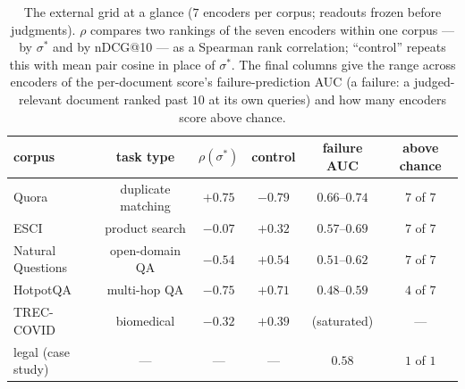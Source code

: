 \documentclass[11pt,letterpaper]{article}
\newcommand{\sstar}{\sigma^{*}}
\begin{document}
\begin{table}[t]
\centering
\caption{The external grid at a glance ($7$ encoders per corpus; readouts
frozen before judgments). $\rho$ compares two rankings of the seven
encoders within one corpus --- by $\sstar$ and by nDCG@10 --- as a
Spearman rank correlation; ``control'' repeats this with mean pair cosine
in place of $\sstar$. The final columns give the range across encoders of
the per-document score's failure-prediction AUC (a failure: a
judged-relevant document ranked past $10$ at its own queries) and how many
encoders score above chance.}
\label{tab:external}
\small
\begin{tabular}{lccccc}
\toprule
corpus & task type & $\rho(\sstar)$ & control & failure AUC & above chance\\
\midrule
Quora & duplicate matching & $+0.75$ & $-0.79$ & $0.66$--$0.74$ & $7$ of $7$\\
ESCI & product search & $-0.07$ & $+0.32$ & $0.57$--$0.69$ & $7$ of $7$\\
Natural Questions & open-domain QA & $-0.54$ & $+0.54$ & $0.51$--$0.62$ & $7$ of $7$\\
HotpotQA & multi-hop QA & $-0.75$ & $+0.71$ & $0.48$--$0.59$ & $4$ of $7$\\
TREC-COVID & biomedical & $-0.32$ & $+0.39$ & (saturated) & ---\\
legal (case study) & --- & --- & --- & $0.58$ & $1$ of $1$\\
\bottomrule
\end{tabular}
\end{table}
\end{document}

